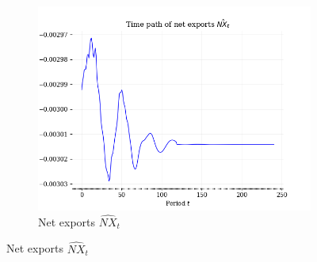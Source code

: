 \documentclass[letterpaper,12pt]{article}
\theoremstyle{definition}
\begin{document}
\begin{figure}[htbp]
\begin{subfigure}[b]{0.4\textwidth}
      \end{subfigure}
      \begin{subfigure}[b]{0.4\textwidth}
        \includegraphics[width=\textwidth]{images/TP_NX_path.png}
        \caption{Net exports $\hat{NX}_t$}
        \label{FigTP_CINX_NX}
      \end{subfigure}
    \end{figure}
\end{document}
